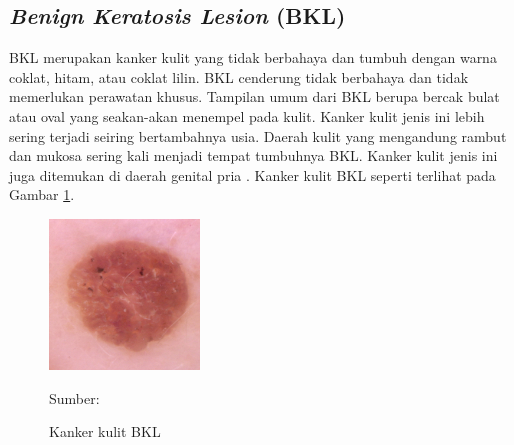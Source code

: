     \subsection{\textit{Benign Keratosis Lesion} (BKL)}
    BKL merupakan kanker kulit yang tidak berbahaya dan tumbuh dengan warna coklat, hitam, atau coklat lilin. BKL cenderung tidak berbahaya dan tidak memerlukan perawatan khusus. Tampilan umum dari BKL berupa bercak bulat atau oval yang seakan-akan menempel pada kulit. Kanker kulit jenis ini lebih sering terjadi seiring bertambahnya usia. Daerah kulit yang mengandung rambut dan mukosa sering kali menjadi tempat tumbuhnya BKL. Kanker kulit jenis ini juga ditemukan di daerah genital pria \citep{Hall2019}. Kanker kulit BKL seperti terlihat pada Gambar \ref{fig:bkl}.
    \begin{figure}[H] 
        \begin{center} 
            \includegraphics[width=4cm]{../img/Skin Cancer BKL - Latex.jpg}
            \caption{Kanker kulit BKL} 
            \label{fig:bkl}
            Sumber: \citep{Codella2018,Combalia2019,Tschandl2018}
        \end{center} 
    \end{figure}

